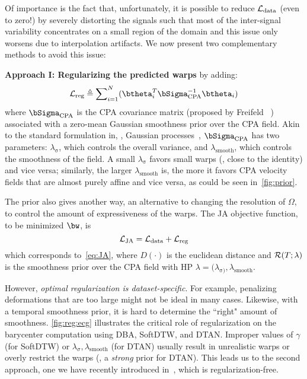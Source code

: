 Of importance is the fact that, unfortunately, it is possible to reduce $\mathcal{L}_{\mathrm{data}}$ (even to zero!) by severely distorting
the signals such that most of the inter-signal variability concentrates on a small region of the domain and this issue only worsens due to interpolation artifacts.
We now present two complementary methods to avoid this issue:

\textbf{Approach I: Regularizing the predicted warps} by adding: 
 \begin{align}
\label{eqn:loss:reg}
 \Lcal_{\mathrm{reg}}\triangleq  
  \sum\nolimits_{i=1}^N(\btheta_i^T \bSigma_{\mathrm{CPA}}^{-1}\btheta_i)
\end{align}
 where $\bSigma_{\mathrm{CPA}}$ is the CPA covariance matrix
  (proposed by Freifeld \etal~\cite{Freifeld:ICCV:2015:CPAB,Freifeld:PAMI:2017:CPAB}) associated with a
  zero-mean Gaussian smoothness prior over the CPA field.
 Akin to the standard formulation in, \eg, Gaussian processes~\cite{Rasmussen:Book:2004:GP},
$\bSigma_{\mathrm{CPA}}$ has two parameters: $\lambda_{\mathrm{\sigma}}$, which controls the overall variance, and $\lambda_{\mathrm{smooth}}$,
which controls the smoothness of the field. A small $\lambda_{\mathrm{\sigma}}$ favors small warps (\ie, close to the identity) and vice
versa; similarly, 
the larger $\lambda_{\mathrm{smooth}}$ is, the more it favors
CPA velocity fields that are almost purely affine and vice versa, as could be seen in~\autoref{fig:prior}.

The prior also gives another way, an alternative to changing the resolution
of $\Omega$, to control the amount of expressiveness of the warps.
The JA objective function, to be minimized \wrt $\bw$, is
\begin{equation}
  \label{eqn:loss:full}
  \mathcal{L}_{\mathrm{JA}} = \mathcal{L}_{\mathrm{data}} + \mathcal{L}_{\mathrm{reg}}
\end{equation}
which corresponds to~\autoref{eq:JA}, where $D(\cdot)$ is the euclidean distance and $\mathcal{R}(T;\lambda)$ is 
the smoothness prior over the CPA field with HP $\lambda=(\lambda_{\mathrm{\sigma})}, \lambda_{\mathrm{smooth}}$.

However, \emph{optimal regularization is dataset-specific}. For example, penalizing deformations that are too large might
not be ideal in many cases. Likewise, with a temporal smoothness prior, it is hard to determine the ``right" amount of smoothness.  \autoref{fig:reg:ecg} illustrates the critical role of regularization on the  barycenter computation using DBA, SoftDTW, and DTAN.
 Improper values of $\gamma$ (for SoftDTW) or $\lambda_{\sigma},\lambda_{\mathrm{smooth}}$ (for DTAN) usually result in unrealistic warps 
 or overly restrict the warps (\eg, a \emph{strong} prior for DTAN).
This leads us to the second approach, one we have recently introduced in~\cite{Shapira:ICML:2023:RFDTAN}, which is regularization-free.

